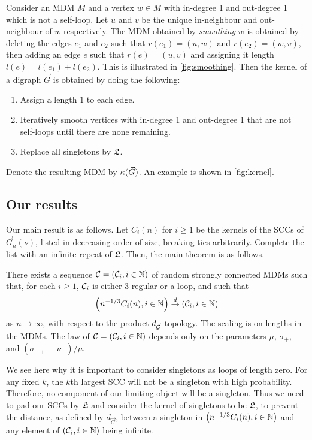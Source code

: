Consider an MDM $M$ and a vertex $w \in M$ with in-degree 1 and out-degree 1 which is not a self-loop. Let $u$ and $v$ be the unique in-neighbour and out-neighbour of $w$ respectively. The MDM obtained by \emph{smoothing} $w$ is obtained by deleting the edges $e_1$ and $e_2$ such that $r(e_1) = (u, w)$ and $r(e_2) = (w, v)$, then adding an edge $e$ such that $r(e) = (u, v)$ and assigning it length $l(e) = l(e_1) + l(e_2)$. This is illustrated in \cref{fig:smoothing}. Then the kernel of a digraph $\vec{G}$ is obtained by doing the following:
\begin{enumerate}
    \item Assign a length $1$ to each edge.
    \item Iteratively smooth vertices with in-degree 1 and out-degree 1 that are not self-loops until there are none remaining.
    \item Replace all singletons by $\mathfrak L$.
\end{enumerate}
Denote the resulting MDM by $\kappa(\vec{G})$. An example is shown in \cref{fig:kernel}.

\subsection{Our results}

Our main result is as follows. Let $C_i(n)$ for $i\geq 1$ be the kernels of the SCCs of $\vec{G}_n(\nu)$, listed in decreasing order of size, breaking ties arbitrarily. Complete the list with an infinite repeat of $\mathfrak L$. Then, the main theorem is as follows.
\begin{theorem}\label{thm.main}
There exists a sequence ${\mathcal C}=({\mathcal C}_i,i\in {\mathbb N})$ of random strongly connected MDMs such that, for each $i\geq 1$, ${\mathcal C}_i$ is either $3$-regular or a loop, and such that 
$$\left(n^{-1/3}C_i(n),i\in {\mathbb N}\right)\overset{d}{\to}\left({\mathcal C}_i,i\in {\mathbb N}\right)$$
as $n\to \infty$, with respect to the product $d_{\vec{{\mathcal G}}}$-topology. The scaling is on lengths in the MDMs. The law of ${\mathcal C}=({\mathcal C}_i,i\in {\mathbb N})$ depends only on the parameters $\mu$, $\sigma_+$, and $(\sigma_{-+}+\nu_-)/\mu$.
\end{theorem}
We see here why it is important to consider singletons as loops of length zero. For any fixed $k$, the $k$th largest SCC will not be a singleton with high probability. Therefore, no component of our limiting object will be a singleton. Thus we need to pad our SCCs by $\mathfrak L$ and consider the kernel of singletons to be $\mathfrak L$, to prevent the distance, as defined by $d_{\vec{G}}$, between a singleton in $\left(n^{-1/3}C_i(n),i\in {\mathbb N}\right)$ and any element of $\left({\mathcal C}_i,i\in {\mathbb N}\right)$ being infinite.

